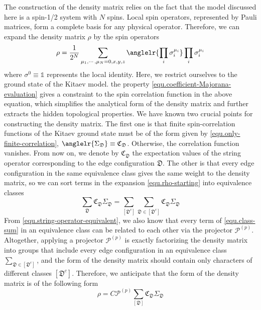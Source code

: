 The construction of the density matrix relies on the fact that the model discussed here is a spin-1/2 system with $N$ spins. Local spin operators, represented by Pauli matrices, form a complete basis for any physical operator. Therefore, we can expand the density matrix $\rho$ by the spin operators~\cite{Latorre-Rico-Vidal_2004}
\begin{equation}\label{equ.rho-starting}
    \rho = \frac{1}{2^N}\sum_{\mu_1,\cdots,\mu_N=0,x,y,z}\anglelr{\prod_{i}\sigma^{\mu_i}_i}\prod_{i}\sigma^{\mu_i}_i
\end{equation}
where $\sigma^0\equiv\mathds{1}$ represents the local identity. Here, we restrict ourselves to the ground state of the Kitaev model. the property \eqref{equ.coefficient-Majorana-evaluation} gives a constraint to the spin correlation function in the above equation, which simplifies the analytical form of the density matrix and further extracts the hidden topological properties. We have known two crucial points for constructing the density matrix. The first one is that finite spin-correlation functions of the Kitaev ground state must be of the form given by \eqref{equ.only-finite-correlation}, $\anglelr{\Sigma_{\mathfrak{D}}} \equiv \mathfrak{C}_{\mathfrak{D}}$. Otherwise, the correlation function vanishes. From now on, we denote by $\mathfrak{C}_{\mathfrak{D}}$ the expectation values of the string operator corresponding to the edge configuration $\mathfrak{D}$. The other is that every edge configuration in the same equivalence class gives the same weight to the density matrix, so we can sort terms in the expansion \eqref{equ.rho-starting} into equivalence classes
\begin{equation}\label{equ.class-sum}
    \sum_{\mathfrak{D}}\mathfrak{C}_{\mathfrak{D}}\Sigma_\mathfrak{D} = \sum_{[\mathfrak{D}^c]}\sum_{\mathfrak{D}\in[\mathfrak{D}^c]}\mathfrak{C}_{\mathfrak{D}}\Sigma_\mathfrak{D}
\end{equation}
From \eqref{equ.string-operator-equivalent}, we also know that every term of \eqref{equ.class-sum} in an equivalence class can be related to each other via the projector $\mathcal{P}^{(p)}$. Altogether, applying a projector $\mathcal{P}^{(p)}$ is exactly factorizing the density matrix into groups that include every edge configuration in an equivalence class $\sum_{\mathfrak{D}\in [\mathfrak{D}^c]}$, and the form of the density matrix should contain only characters of different classes $[\mathfrak{D}^c]$. Therefore, we anticipate that the form of the density matrix is of the following form
\begin{equation}\label{equ.rho-factorization}
    \rho = C \mathcal{P}^{(p)} \sum_{[\mathfrak{D}]} \mathfrak{C}_{\mathfrak{D}} \Sigma_{\mathfrak{D}}
\end{equation}
